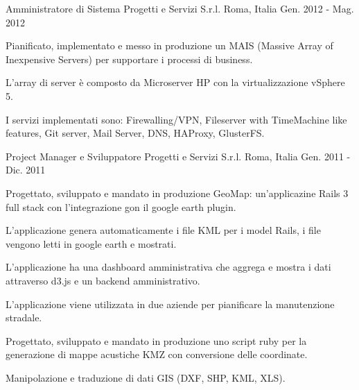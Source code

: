 \begin{cventries}
  \cventry
    {Amministratore di Sistema} %
    {Progetti e Servizi S.r.l.} %
    {Roma, Italia} %
    {Gen. 2012 - Mag. 2012} %
    {
      \begin{cvitems} %
        \item {Pianificato, implementato e messo in produzione un MAIS (Massive Array of Inexpensive Servers) per supportare i processi di business.}
        \item {L'array di server è composto da Microserver HP con la virtualizzazione vSphere 5.}
        \item {I servizi implementati sono: Firewalling/VPN, Fileserver with TimeMachine like features, Git server, Mail Server, DNS, HAProxy, GlusterFS.}
      \end{cvitems}
    }

  \cventry
    {Project Manager e Sviluppatore} %
    {Progetti e Servizi S.r.l.} %
    {Roma, Italia} %
    {Gen. 2011 - Dic. 2011} %
    {
      \begin{cvitems} %
        \item {Progettato, sviluppato e mandato in produzione GeoMap: un'applicazine Rails 3 full stack con l'integrazione gon il google earth plugin.}
        \item {L'applicazione genera automaticamente i file KML per i model Rails, i file vengono letti in google earth e mostrati.}
        \item {L'applicazione ha una dashboard amministrativa che aggrega e mostra i dati attraverso d3.js e un backend amministrativo.}
        \item {L'applicazione viene utilizzata in due aziende per pianificare la manutenzione stradale.}
        \item {Progettato, sviluppato e mandato in produzione uno script ruby per la generazione di mappe acustiche KMZ con conversione delle coordinate.}
        \item {Manipolazione e traduzione di dati GIS (DXF, SHP, KML, XLS).}
      \end{cvitems}
    }


\end{cventries}
